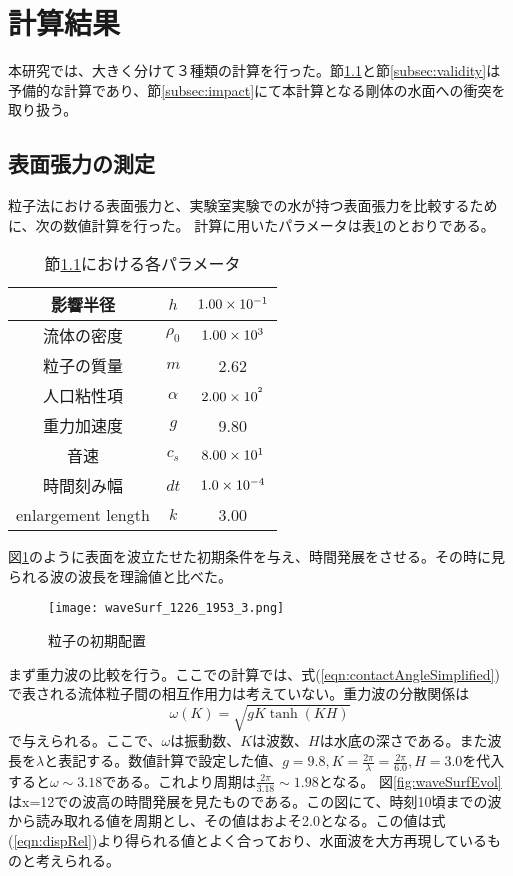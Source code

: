 \documentclass[]{jsarticle}
\begin{document}
\newpage
\section{計算結果}
本研究では、大きく分けて３種類の計算を行った。節\ref{subsec:surfaceCoef}と節\ref{subsec:validity}は予備的な計算であり、節\ref{subsec:impact}にて本計算となる剛体の水面への衝突を取り扱う。
\subsection{表面張力の測定}
\label{subsec:surfaceCoef}
粒子法における表面張力と、実験室実験\cite{Duez2007}での水が持つ表面張力を比較するために、次の数値計算を行った。
計算に用いたパラメータは表\ref{tbl:param}のとおりである。
\begin{table}[h]
  \caption{節\ref{subsec:surfaceCoef}における各パラメータ}
  \label{tbl:param}
  \begin{center}
    \begin{tabular}{|c|c|c|}\hline
      影響半径&$h$&$\rm{1.00\times10^{-1}}$ \\ \hline
      流体の密度&$\rho_0$&$\rm{1.00\times10^3}$ \\ \hline
      粒子の質量&$m$&2.62 \\ \hline
      人口粘性項&$\alpha$&$\rm{2.00\times10^{^2}}$ \\ \hline
      重力加速度&$g$&9.80 \\ \hline
      音速&$c_s$&$\rm{8.00\times10^1}$ \\ \hline
      時間刻み幅&$dt$&$\rm{1.0\times10^{-4}}$ \\ \hline
      enlargement length&$k$&3.00 \\ \hline
    \end{tabular}
  \end{center}
\end{table}

図\ref{fig:waveSurfInit}のように表面を波立たせた初期条件を与え、時間発展をさせる。その時に見られる波の波長を理論値と比べた。
\begin{figure}[H]
  \centering
  \texttt{[image: waveSurf\_1226\_1953\_3.png]}
  \caption{粒子の初期配置}
  \label{fig:waveSurfInit}
\end{figure}
まず重力波の比較を行う。ここでの計算では、式(\ref{eqn:contactAngleSimplified})で表される流体粒子間の相互作用力は考えていない。重力波の分散関係は
\begin{equation}
  \label{eqn:dispRel}
  \omega(K)=\sqrt{gK \tanh (KH)}
\end{equation}
で与えられる\cite{tatsumiKiso}。ここで、$\omega$は振動数、$K$は波数、$H$は水底の深さである。また波長を$\lambda$と表記する。数値計算で設定した値、$g=9.8, K=\frac{2\pi}{\lambda}=\frac{2\pi}{6.0}, H=3.0$を代入すると$\omega\sim3.18$である。これより周期は$\frac{2\pi}{3.18}\sim1.98$となる。
図\ref{fig:waveSurfEvol}はx=12での波高の時間発展を見たものである。この図にて、時刻10頃までの波から読み取れる値を周期とし、その値はおよそ2.0となる。この値は式(\ref{eqn:dispRel})より得られる値とよく合っており、水面波を大方再現しているものと考えられる。
\end{document}
